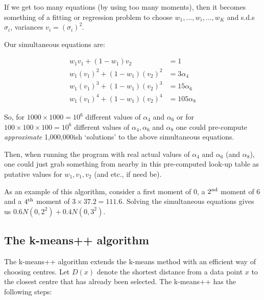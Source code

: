 \documentclass{elsarticle}
\begin{document}
If we get too many equations (by using too many moments), then it
becomes something of a fitting or regression problem to choose
$w_1, ..., w_i, ..., w_K$ and s.d.s $\sigma_i$, variances $v_i = (\sigma_i)^2$.

Our simultaneous equations are:

\begin{align*}
w_1 v_1       + (1 - w_1) v_2       &=    1\\
w_1 (v_1)^2  + (1 - w_1) (v_2)^2  &=    3 \alpha_4\\
w_1 (v_1)^3  + (1 - w_1) (v_2)^3  &=   15 \alpha_6\\
w_1 (v_1)^4  + (1 - w_1) (v_2)^4  &=  105 \alpha_8
\end{align*}


So, for $1000 \times 1000 = 10^6$ different values of $\alpha_4$ and $\alpha_6$
or for $100 \times 100 \times 100 = 10^6$ different values of $\alpha_4, \alpha_6$ and $\alpha_8$
one could pre-compute {\em approximate} 1,000,000ish `solutions' to the above simultaneous equations.

Then, when running the program with real actual values of $\alpha_4$ and $\alpha_6$ (and $\alpha_8$),
one could just grab something from nearby in this pre-computed look-up table
as putative values for $w_1, v_1, v_2$ (and etc., if need be).

%
As an
example of this algorithm, consider a first moment of $0$, a $2^{\rm nd}$ moment of $6$ and a $4^{\rm th}$ moment of $3 \times 37.2 = 111.6$.
Solving the simultaneous equations gives us $0.6 N(0, 2^2) +  0.4 N(0, 3^2)$.

\subsection{The k-means++ algorithm}

The k-means++ algorithm extends the k-means method with an efficient way of choosing centres. Let $D(x)$ denote the shortest distance from a data point $x$ to the closest centre that has already been selected. The k-means++ has the following steps:
\end{document}

